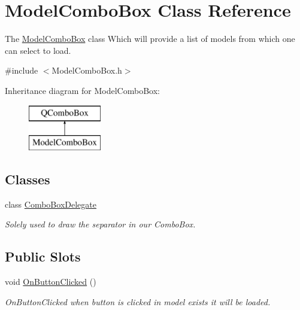 \hypertarget{class_model_combo_box}{}\section{Model\+Combo\+Box Class Reference}
\label{class_model_combo_box}


The \hyperlink{class_model_combo_box}{Model\+Combo\+Box} class Which will provide a list of models from which one can select to load.  




{\ttfamily \#include $<$Model\+Combo\+Box.\+h$>$}

Inheritance diagram for Model\+Combo\+Box\+:\begin{figure}[H]
\begin{center}
\leavevmode
\includegraphics[height=2.000000cm]{class_model_combo_box}
\end{center}
\end{figure}
\subsection*{Classes}
\begin{DoxyCompactItemize}
\item 
class \hyperlink{class_model_combo_box_1_1_combo_box_delegate}{Combo\+Box\+Delegate}
\begin{DoxyCompactList}\small\item\em Solely used to draw the separator in our Combo\+Box. \end{DoxyCompactList}\end{DoxyCompactItemize}
\subsection*{Public Slots}
\begin{DoxyCompactItemize}
\item 
\hypertarget{class_model_combo_box_ac45a64e2c5ab7232c5dc99ef3eccd154}{}void \hyperlink{class_model_combo_box_ac45a64e2c5ab7232c5dc99ef3eccd154}{On\+Button\+Clicked} ()\label{class_model_combo_box_ac45a64e2c5ab7232c5dc99ef3eccd154}

\begin{DoxyCompactList}\small\item\em On\+Button\+Clicked when button is clicked in model exists it will be loaded. \end{DoxyCompactList}\end{DoxyCompactItemize}
